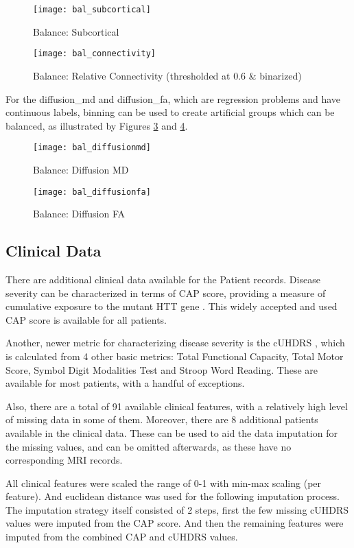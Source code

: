 \begin{figure}[H]
\centering
\texttt{[image: bal\_subcortical]}
\caption{Balance: Subcortical}
\label{fig:bal_sub}
\end{figure}

\begin{figure}[H]
\centering
\texttt{[image: bal\_connectivity]}
\caption{Balance: Relative Connectivity (thresholded at $0.6$ \& binarized)}
\label{fig:bal_con}
\end{figure}

For the diffusion\_md and diffusion\_fa, which are regression problems and have continuous labels, binning can be used to create artificial groups which can be balanced, as illustrated by Figures \ref{fig:bal_md} and \ref{fig:bal_fa}.

\begin{figure}[H]
\centering
\texttt{[image: bal\_diffusionmd]}
\caption{Balance: Diffusion MD}
\label{fig:bal_md}
\end{figure}

\begin{figure}[H]
\centering
\texttt{[image: bal\_diffusionfa]}
\caption{Balance: Diffusion FA}
\label{fig:bal_fa}
\end{figure}

\subsection{Clinical Data}
\label{sec:clinical}

There are additional clinical data available for the Patient records. Disease severity can be characterized in terms of \ac{CAP} score, providing a measure of cumulative exposure to the mutant HTT gene \cite{cap}. This widely accepted and used \ac{CAP} score is available for all patients.\par
Another, newer metric for characterizing disease severity is the \ac{cUHDRS} \cite{uhdrs}, which is calculated from 4 other basic metrics: Total Functional Capacity, Total Motor Score, Symbol Digit Modalities Test and Stroop Word Reading. These are available for most patients, with a handful of exceptions.\par
Also, there are a total of 91 available clinical features, with a relatively high level of missing data in some of them. Moreover, there are 8 additional patients available in the clinical data. These can be used to aid the data imputation for the missing values, and can be omitted afterwards, as these have no corresponding \ac{MRI} records.\par
All clinical features were scaled the range of 0-1 with min-max scaling (per feature). And euclidean distance was used for the following imputation process. The imputation strategy itself consisted of 2 steps, first the few missing \ac{cUHDRS} values were imputed from the \ac{CAP} score. And then the remaining features were imputed from the combined \ac{CAP} and \ac{cUHDRS} values.

